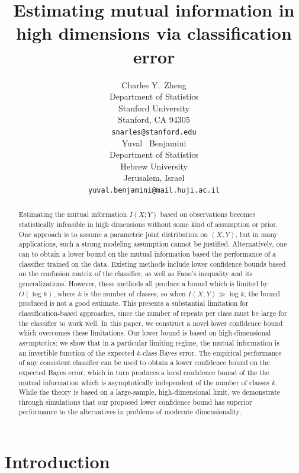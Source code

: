 \documentclass{article}
\title{Estimating mutual information in high dimensions via classification error}
\author{
  Charles Y.~Zheng \\
  Department of Statistics\\
  Stanford University\\
  Stanford, CA 94305 \\
  \texttt{snarles@stanford.edu} \\
  \And
  Yuval ~Benjamini \\
  Department of Statistics \\
  Hebrew University\\
  Jerusalem, Israel\\
  \texttt{yuval.benjamini@mail.huji.ac.il}
}
\begin{document}

\maketitle

\begin{abstract}
Estimating the mutual information $I(X; Y)$ based on observations
becomes statistically infeasible in high dimensions without some kind
of assumption or prior.  One approach is to assume a parametric joint
distribution on $(X, Y)$, but in many applications, such a strong
modeling assumption cannot be justified.  Alternatively, one can to
obtain a lower bound on the mutual information based the performance
of a classifier trained on the data.  Existing methods include lower
confidence bounds based on the confusion matrix of the classifier, as
well as Fano's inequality and its generalizations.  However, these
methods all produce a bound which is limited by $O(\log k)$, where $k$
is the number of classes, so when $I(X; Y) \gg \log k$, the bound
produced is not a good estimate.  This presents a substantial
limitation for classification-based approaches, since the number of
repeats per class must be large for the classifier to work well. In
this paper, we construct a novel lower confidence bound which
overcomes these limitations.  Our lower bound is based on
high-dimensional asymptotics: we show that in a particular limiting
regime, the mutual information is an invertible function of the
expected $k$-class Bayes error.  The empirical performance of any
consistent classifier can be used to obtain a lower confidence bound
on the expected Bayes error, which in turn produces a local confidence
bound of the the mutual information which is asymptotically
independent of the number of classes $k$.  While the theory is based
on a large-sample, high-dimensional limit, we demonstrate through
simulations that our proposed lower confidence bound has superior
performance to the alternatives in problems of moderate
dimensionality.
\end{abstract}

\section{Introduction}
\end{document}
